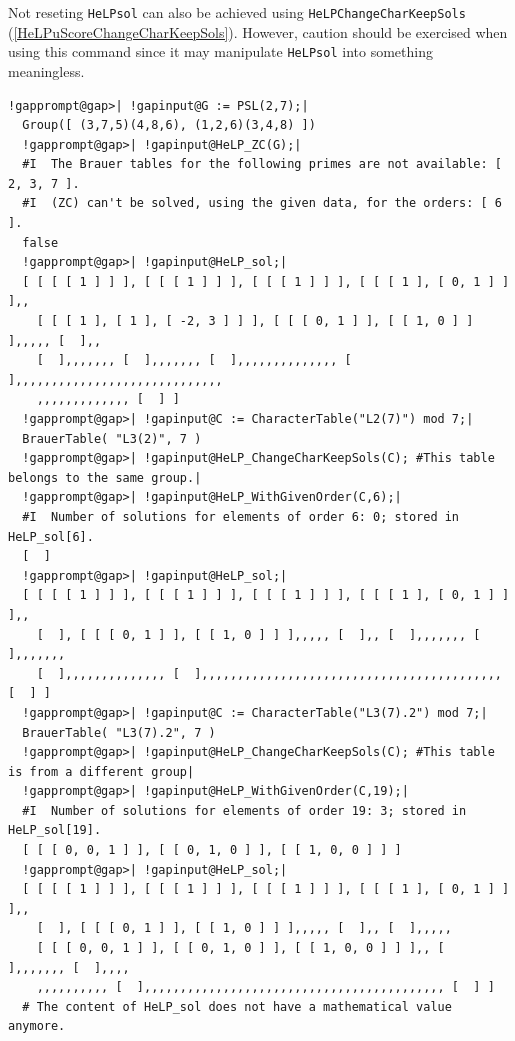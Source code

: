 \documentclass[a4paper,11pt]{report}
\begin{document}
{{ Not reseting \texttt{HeLP{\textunderscore}sol} can also be achieved using \texttt{HeLP{\textunderscore}ChangeCharKeepSols} (\ref{HeLPuScoreChangeCharKeepSols}). However, caution should be exercised when using this command since it may
manipulate \texttt{HeLP{\textunderscore}sol} into something meaningless. 
\begin{Verbatim}[commandchars=!@|,fontsize=\small,frame=single,label=Example]
  !gapprompt@gap>| !gapinput@G := PSL(2,7);|
  Group([ (3,7,5)(4,8,6), (1,2,6)(3,4,8) ])
  !gapprompt@gap>| !gapinput@HeLP_ZC(G);|
  #I  The Brauer tables for the following primes are not available: [ 2, 3, 7 ].
  #I  (ZC) can't be solved, using the given data, for the orders: [ 6 ].
  false
  !gapprompt@gap>| !gapinput@HeLP_sol;|
  [ [ [ [ 1 ] ] ], [ [ [ 1 ] ] ], [ [ [ 1 ] ] ], [ [ [ 1 ], [ 0, 1 ] ] ],, 
    [ [ [ 1 ], [ 1 ], [ -2, 3 ] ] ], [ [ [ 0, 1 ] ], [ [ 1, 0 ] ] ],,,,, [  ],, 
    [  ],,,,,,, [  ],,,,,,, [  ],,,,,,,,,,,,,, [  ],,,,,,,,,,,,,,,,,,,,,,,,,,,,,
    ,,,,,,,,,,,,, [  ] ]
  !gapprompt@gap>| !gapinput@C := CharacterTable("L2(7)") mod 7;|
  BrauerTable( "L3(2)", 7 )
  !gapprompt@gap>| !gapinput@HeLP_ChangeCharKeepSols(C); #This table belongs to the same group.|
  !gapprompt@gap>| !gapinput@HeLP_WithGivenOrder(C,6);|
  #I  Number of solutions for elements of order 6: 0; stored in HeLP_sol[6].
  [  ]
  !gapprompt@gap>| !gapinput@HeLP_sol;|
  [ [ [ [ 1 ] ] ], [ [ [ 1 ] ] ], [ [ [ 1 ] ] ], [ [ [ 1 ], [ 0, 1 ] ] ],, 
    [  ], [ [ [ 0, 1 ] ], [ [ 1, 0 ] ] ],,,,, [  ],, [  ],,,,,,, [  ],,,,,,, 
    [  ],,,,,,,,,,,,,, [  ],,,,,,,,,,,,,,,,,,,,,,,,,,,,,,,,,,,,,,,,,, [  ] ]
  !gapprompt@gap>| !gapinput@C := CharacterTable("L3(7).2") mod 7;|
  BrauerTable( "L3(7).2", 7 )
  !gapprompt@gap>| !gapinput@HeLP_ChangeCharKeepSols(C); #This table is from a different group|
  !gapprompt@gap>| !gapinput@HeLP_WithGivenOrder(C,19);|
  #I  Number of solutions for elements of order 19: 3; stored in HeLP_sol[19].
  [ [ [ 0, 0, 1 ] ], [ [ 0, 1, 0 ] ], [ [ 1, 0, 0 ] ] ]
  !gapprompt@gap>| !gapinput@HeLP_sol;|
  [ [ [ [ 1 ] ] ], [ [ [ 1 ] ] ], [ [ [ 1 ] ] ], [ [ [ 1 ], [ 0, 1 ] ] ],, 
    [  ], [ [ [ 0, 1 ] ], [ [ 1, 0 ] ] ],,,,, [  ],, [  ],,,,, 
    [ [ [ 0, 0, 1 ] ], [ [ 0, 1, 0 ] ], [ [ 1, 0, 0 ] ] ],, [  ],,,,,,, [  ],,,,
    ,,,,,,,,,, [  ],,,,,,,,,,,,,,,,,,,,,,,,,,,,,,,,,,,,,,,,,, [  ] ]
  # The content of HeLP_sol does not have a mathematical value anymore.
\end{Verbatim}
}}
\end{document}
